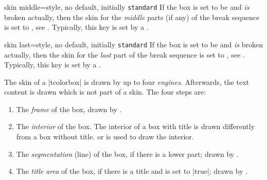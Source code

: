 \begin{docTcbKey}{skin middle}{=}{style, no default, initially \texttt{standard}}
  If the box is set to be  and \emph{is} broken actually,
  then the skin for the \emph{middle} parts (if any) of the break sequence
  is set to , see .
  Typically, this key is set by a .
\end{docTcbKey}


\begin{docTcbKey}{skin last}{=}{style, no default, initially \texttt{standard}}
  If the box is set to be  and \emph{is} broken actually,
  then the skin for the \emph{last} part of the break sequence
  is set to , see .
  Typically, this key is set by a .
\end{docTcbKey}


\clearpage

The skin of a |tcolorbox| is drawn by up to four \emph{engines}.
Afterwards, the text content is drawn which is not part of a skin.
The four steps are:
\begin{enumerate}
\item The \emph{frame} of the box, drawn by .
\item The \emph{interior} of the box. The interior of a box with title is
  drawn differently from a box without title.
   or 
  is used to draw the interior.
\item The \emph{segmentation} (line) of the box, if there is a lower part;
  drawn by .
\item The \emph{title area} of the box, if there is a title and
   is set to |true|; drawn
  by .
\end{enumerate}

